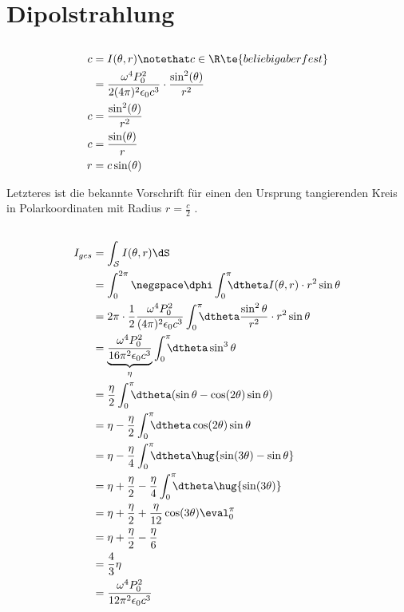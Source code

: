 \documentclass[11pt]{article}
\begin{document}
\section{Dipolstrahlung}
\subsection{}
\begin{align*}
    c &= I(\theta,r)\notethat c\in\R  \te{ beliebig aber fest}\\
    &= \frac{\omega^4 P_0^2}{2(4\pi)^2\epsilon_0 c^3}\cdot \frac{\sin^2(\theta)}{r^2}\\
    c &= \frac{\sin^2(\theta)}{r^2}\\
    c &= \frac{\sin(\theta)}{r}\\
    r &= c \sin(\theta)\
\end{align*}
\begin{adjustwidth}{20pt}{}
    Letzteres ist die bekannte Vorschrift für einen den Ursprung tangierenden Kreis in 
    Polarkoordinaten mit Radius \(r=\frac{c}{2}\) . 
\end{adjustwidth}

\subsection{}
\begin{align*}
    I_{ges} &= \int_{\mathcal S} I(\theta,r)\dS\\
    &= \int_{0}^{2\pi}\negspace\dphi\int_{0}^{\pi}\hspace{-0.2cm}\dtheta I(\theta,r)\cdot r^2 \sin\theta\\
    &= 2\pi\cdot \frac{1}{2}\frac{\omega^4 P_0^2}{(4\pi)^2 \epsilon_0 c^3}\int_{0}^{\pi}\hspace{-0.2cm}\dtheta \frac{\sin^2\theta}{r^2}\cdot r^2 \sin\theta\\
    &= \underbrace{\frac{\omega^4 P_0^2}{16\pi^2 \epsilon_0 c^3}}_{\eta}\int_{0}^{\pi}\hspace{-0.2cm}\dtheta\sin^3\theta\\
    &= \frac \eta2 \int_{0}^{\pi}\hspace{-0.2cm}\dtheta(\sin\theta-\cos(2\theta)\sin\theta)\\
    &= \eta - \frac\eta2\int_{0}^{\pi}\hspace{-0.2cm}\dtheta\cos(2\theta)\sin\theta\\
    &= \eta - \frac\eta4 \int_{0}^{\pi}\hspace{-0.2cm}\dtheta\hug{\sin(3\theta)-\sin\theta}\\
    &= \eta + \frac\eta2- \frac\eta4 \int_{0}^{\pi}\hspace{-0.2cm}\dtheta\hug{\sin(3\theta)}\\
    &= \eta + \frac\eta2 + \frac\eta{12} \cos(3\theta)\eval_{0}^{\pi}\\
    &= \eta + \frac\eta2 - \frac\eta{6}\\
    &= \frac{4}{3}\eta\\
    &= \frac{\omega^4 P_0^2}{12\pi^2 \epsilon_0 c^3}\\
\end{align*}
\end{document}

